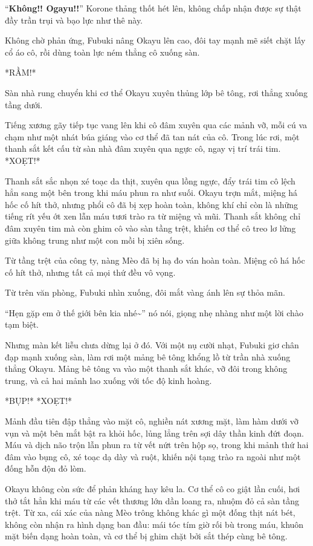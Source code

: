 \documentclass[../main.tex]{subfiles}
\begin{document}
``\textbf{Không!! Ogayu!!}'' Korone thảng thốt hét lên, không chấp nhận được sự thật đầy trần trụi và bạo lực như thê này.

Không chờ phản ứng, Fubuki nâng Okayu lên cao, đôi tay mạnh mẽ siết chặt lấy cổ áo cô, rồi dùng toàn lực ném thẳng cô xuống sàn.

*RẦM!*

Sàn nhà rung chuyển khi cơ thể Okayu xuyên thủng lớp bê tông, rơi thẳng xuống tầng dưới.

Tiếng xương gãy tiếp tục vang lên khi cô đâm xuyên qua các mảnh vỡ, mỗi cú va chạm như một nhát búa giáng vào cơ thể đã tan nát của cô. Trong lúc rơi, một thanh sắt kết cấu từ sàn nhà đâm xuyên qua ngực cô, ngay vị trí trái tim. *XOẸT!*

Thanh sắt sắc nhọn xé toạc da thịt, xuyên qua lồng ngực, đẩy trái tim cô lệch hẳn sang một bên trong khi máu phun ra như suối. Okayu trợn mắt, miệng há hốc cố hít thở, nhưng phổi cô đã bị xẹp hoàn toàn, không khí chỉ còn là những tiếng rít yếu ớt xen lẫn máu tươi trào ra từ miệng và mũi. Thanh sắt không chỉ đâm xuyên tim mà còn ghim cô vào sàn tầng trệt, khiến cơ thể cô treo lơ lửng giữa không trung như một con mồi bị xiên sống.

Từ tầng trệt của công ty, nàng Mèo đã bị hạ đo ván hoàn toàn. Miệng cô há hốc cố hít thở, nhưng tất cả mọi thứ đều vô vọng.

Từ trên văn phòng, Fubuki nhìn xuống, đôi mắt vàng ánh lên sự thỏa mãn.

``Hẹn gặp em ở thế giới bên kia nhé\~{}'' nó nói, giọng nhẹ nhàng như một lời chào tạm biệt.

Nhưng màn kết liễu chưa dừng lại ở đó. Với một nụ cười nhạt, Fubuki giơ chân đạp mạnh xuống sàn, làm rơi một mảng bê tông khổng lồ từ trần nhà xuống thẳng Okayu. Mảng bê tông va vào một thanh sắt khác, vỡ đôi trong không trung, và cả hai mảnh lao xuống với tốc độ kinh hoàng.

*BỤP!* *XOẸT!*

Mảnh đầu tiên đập thẳng vào mặt cô, nghiền nát xương mặt, làm hàm dưới vỡ vụn và một bên mắt bật ra khỏi hốc, lủng lẳng trên sợi dây thần kinh đứt đoạn. Máu và dịch não trộn lẫn phun ra từ vết nứt trên hộp sọ, trong khi mảnh thứ hai đâm vào bụng cô, xé toạc dạ dày và ruột, khiến nội tạng trào ra ngoài như một đống hỗn độn đỏ lòm.

Okayu không còn sức để phản kháng hay kêu la. Cơ thể cô co giật lần cuối, hơi thở tắt hẳn khi máu từ các vết thương lớn dần loang ra, nhuộm đỏ cả sàn tầng trệt. Từ xa, cái xác của nàng Mèo trông không khác gì một đống thịt nát bét, không còn nhận ra hình dạng ban đầu: mái tóc tím giờ rối bù trong máu, khuôn mặt biến dạng hoàn toàn, và cơ thể bị ghim chặt bởi sắt thép cùng bê tông.
\end{document}
